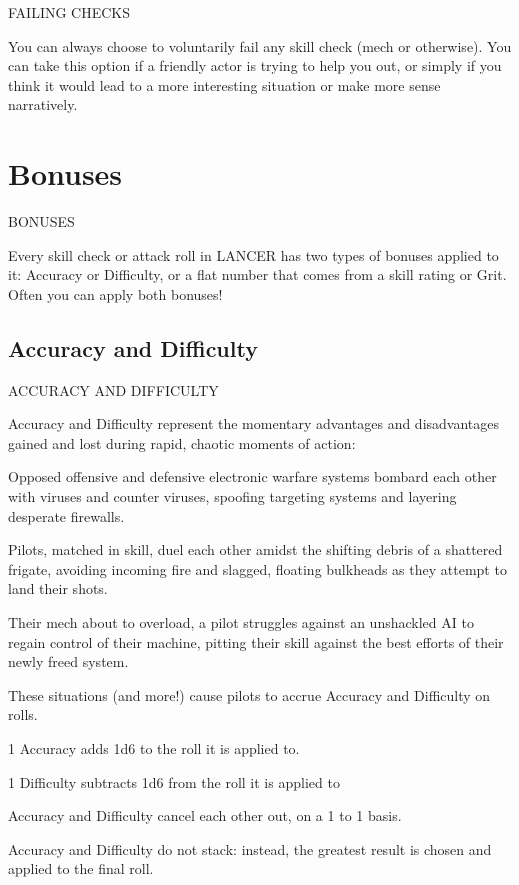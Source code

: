                                              FAILING CHECKS

You can always choose to voluntarily fail any skill check (mech or otherwise). You can take this
option if a friendly actor is trying to help you out, or simply if you think it would lead to a more
interesting situation or make more sense narratively.

\chapter{Bonuses}
   BONUSES

Every skill check or attack roll in LANCER has two types of bonuses applied to it: Accuracy or
Difficulty, or a flat number that comes from a skill rating or Grit. Often you can apply both bonuses!

\section{Accuracy and Difficulty}
                                ACCURACY AND DIFFICULTY

Accuracy and Difficulty represent the momentary advantages and disadvantages gained and
lost during rapid, chaotic moments of action:


Opposed offensive and defensive electronic warfare systems bombard each other with viruses
and counter viruses, spoofing targeting systems and layering desperate firewalls.

Pilots, matched in skill, duel each other amidst the shifting debris of a shattered frigate, avoiding
incoming fire and slagged, floating bulkheads as they attempt to land their shots.

Their mech about to overload, a pilot struggles against an unshackled AI to regain control of their
machine, pitting their skill against the best efforts of their newly freed system.




These situations (and more!) cause pilots to accrue Accuracy and Difficulty on rolls.


1 Accuracy adds 1d6 to the roll it is applied to.

1 Difficulty subtracts 1d6 from the roll it is applied to

Accuracy and Difficulty cancel each other out, on a 1 to 1 basis.

Accuracy and Difficulty do not stack: instead, the greatest result is chosen and applied to the
final roll.

